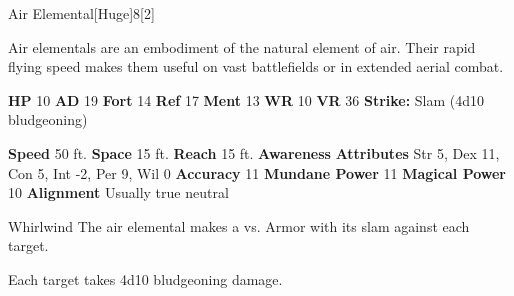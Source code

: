   \begin{monsection}{Air Elemental}[Huge]{8}[2]
    \vspace{-1em}\vspace{-1em}
    \vspace{0em}

    
    Air elementals are an embodiment of the natural element of air.
    Their rapid flying speed makes them useful on vast battlefields or in extended aerial combat.
  
    

    \begin{spellcontent}
      \begin{spelltargetinginfo}
        \pari \textbf{HP} 10 \monsep
          \textbf{AD} 19 \monsep
          \textbf{Fort} 14 \monsep
          \textbf{Ref} 17 \monsep
          \textbf{Ment} 13
        \pari \textbf{WR} 10 \monsep
        \textbf{VR} 36
        \pari \textbf{Strike:}
            Slam  (4d10 bludgeoning)
      \end{spelltargetinginfo}
    \end{spellcontent}
    \begin{monsterfooter}
      \pari \textbf{Speed} 50 ft. \monsep
        \textbf{Space} 15 ft. \monsep
        \textbf{Reach} 15 ft.
      \pari \textbf{Awareness} 
      \pari \textbf{Attributes}
        Str 5, Dex 11,
        Con 5, Int -2,
        Per 9, Wil 0
      \pari \textbf{Accuracy} 11 \monsep
        \textbf{Mundane Power} 11 \monsep
      \textbf{Magical Power} 10
      \pari \textbf{Alignment} Usually true neutral
    \end{monsterfooter}
  \end{monsection}
  \begin{freeability}{Whirlwind}
       The air elemental makes a 
         vs. Armor
        with its slam against each target.
    
    \hit Each target takes 4d10 bludgeoning damage.
    \end{freeability}
  
